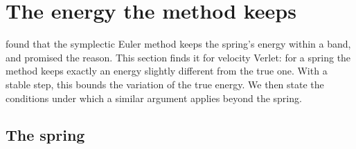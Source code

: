 \section{The energy the method keeps}
\label{sec:in-shadow}

 found that the symplectic Euler method keeps the
spring's energy within a band, and promised the reason. This section finds
it for velocity Verlet: for a spring the method keeps exactly an energy
slightly different from the true one. With a stable step, this bounds the
variation of the true energy. We then state the conditions under which a
similar argument applies beyond the spring.

\subsection*{The spring}

